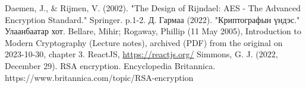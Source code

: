
\singlespace
{}
\begin{thebibliography}{}
	Daemen, J., \& Rijmen, V. (2002). "The Design of Rijndael: AES - The Advanced Encryption Standard." Springer. p.1-2.
	Д. Гармаа (2022). "Криптографын үндэс." Улаанбаатар хот.
	Bellare, Mihir; Rogaway, Phillip (11 May 2005), Introduction to Modern Cryptography (Lecture notes), archived (PDF) from the original on 2023-10-30, chapter 3.
	ReactJS, \url{https://reactjs.org/}
	Simmons, G. J. (2022, December 29). RSA encryption. Encyclopedia Britannica. https://www.britannica.com/topic/RSA-encryption


\end{thebibliography}
